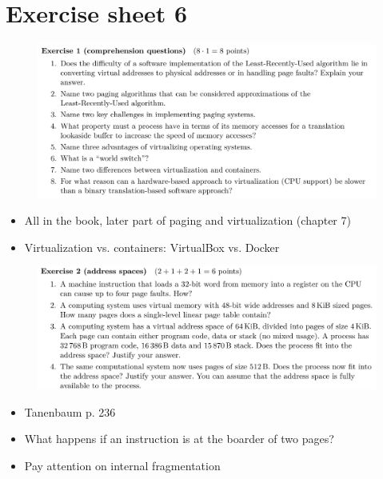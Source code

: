 \documentclass[10pt]{beamer}
\begin{document}
    
\section*{Exercise sheet 6}
\frame{\sectionpage}
\begin{frame}{}
 \begin{figure}
           \includegraphics[keepaspectratio, width=\textwidth, height=\textheight-2\baselineskip-2\baselineskip]{img/ex6_100.png} \\
        \end{figure}
        \begin{itemize}
         \item All in the book, later part of paging and virtualization (chapter 7)
         \item Virtualization vs. containers: VirtualBox vs. Docker
        \end{itemize}
        \framebreak
        
  \begin{figure}
          \includegraphics[keepaspectratio, width=\textwidth, height=\textheight-2\baselineskip-2\baselineskip]{img/ex6_101.png} \\
        \end{figure}
        \begin{itemize}
         \item Tanenbaum p. 236
         \item What happens if an instruction is at the boarder of two pages?
         \item Pay attention on internal fragmentation
         \end{itemize}
         

\end{frame}
\end{document}

